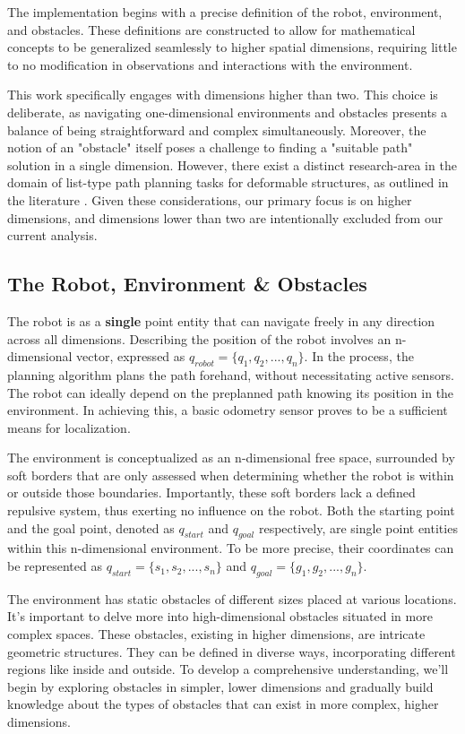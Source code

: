 \documentclass{IEEEtaes}
\begin{document}
{The implementation begins with a precise definition of the robot, environment, and obstacles. These definitions are constructed to allow for mathematical concepts to be generalized seamlessly to higher spatial dimensions, requiring little to no modification in observations and interactions with the environment.

This work specifically engages with dimensions higher than two. This choice is deliberate, as navigating one-dimensional environments and obstacles presents a balance of being straightforward and complex simultaneously. Moreover, the notion of an "obstacle" itself poses a challenge to finding a "suitable path" solution in a single dimension. However, there exist a distinct research-area in the domain of list-type path planning tasks for deformable structures, as outlined in the literature \cite{one-dim}. Given these considerations, our primary focus is on higher dimensions, and dimensions lower than two are intentionally excluded from our current analysis.

\subsection{The Robot, Environment \& Obstacles }

The robot is as a \textbf{single} point entity that can navigate freely in any direction across all dimensions. Describing the position of the robot involves an n-dimensional vector, expressed as $q_{robot} = \{q_1, q_2, ..., q_n\}$. In the process, the planning algorithm plans the path forehand, without necessitating active sensors. The robot can ideally depend on the preplanned path knowing its position in the environment. In achieving this, a basic odometry sensor proves to be a sufficient means for localization.

The environment is conceptualized as an n-dimensional free space, surrounded by soft borders that are only assessed when determining whether the robot is within or outside those boundaries. Importantly, these soft borders lack a defined repulsive system, thus exerting no influence on the robot. Both the starting point and the goal point, denoted as $q_{start}$ and $q_{goal}$ respectively, are single point entities within this n-dimensional environment. To be more precise, their coordinates can be represented as $q_{start} = \{s_1, s_2, ... ,s_n\}$ and $q_{goal} = \{g_1, g_2, ... ,g_n\}$.

The environment has static obstacles of different sizes placed at various locations. It's important to delve more into high-dimensional obstacles situated in more complex spaces. These obstacles, existing in higher dimensions, are intricate geometric structures. They can be defined in diverse ways, incorporating different regions like inside and outside. To develop a comprehensive understanding, we'll begin by exploring obstacles in simpler, lower dimensions and gradually build knowledge about the types of obstacles that can exist in more complex, higher dimensions.

}
\end{document}
